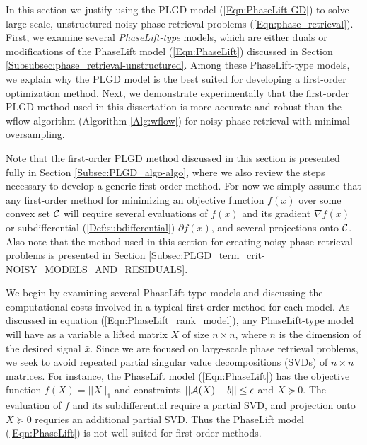 In this section we justify using the PLGD model (\ref{Eqn:PhaseLift-GD}) to solve large-scale, unstructured noisy phase retrieval problems (\ref{Eqn:phase_retrieval}). 
First, we examine several \textit{PhaseLift-type} models, which are either duals or modifications of the PhaseLift model (\ref{Eqn:PhaseLift}) discussed in Section \ref{Subsubsec:phase_retrieval-unstructured}.
Among these PhaseLift-type models, we explain why the PLGD model is the best suited for developing a first-order optimization method.
Next, we demonstrate experimentally that the first-order PLGD method used in this dissertation is more accurate and robust than the wflow algorithm (Algorithm \ref{Alg:wflow}) for noisy phase retrieval with minimal oversampling.

Note that the first-order PLGD method discussed in this section is presented fully in Section \ref{Subsec:PLGD_algo-algo}, where we also 
review the steps necessary to develop a generic first-order method.  
For now we simply assume that any first-order method for minimizing an objective function $f(x)$ over some convex set ${\mathcal C}$ will require several evaluations of $f(x)$ and its gradient $\nabla f(x)$ or subdifferential (\ref{Def:subdifferential}) $\partial f(x)$, and several projections onto ${\mathcal C}$.
Also note that the method used in this section for creating noisy phase retrieval problems is presented in Section \ref{Subsec:PLGD_term_crit-NOISY_MODELS_AND_RESIDUALS}.





We begin by examining several PhaseLift-type models and discussing the computational costs involved in a typical first-order method for each model.
As discussed in equation (\ref{Eqn:PhaseLift_rank_model}), any PhaseLift-type model will have as a variable a lifted matrix $X$ of size $n \times n$, where $n$ is the dimension of the desired signal $\bar{x}$.
Since we are focused on large-scale phase retrieval problems, we seek to avoid repeated partial singular value decompositions (SVDs) of $n \times n$ matrices.
For instance, the PhaseLift model (\ref{Eqn:PhaseLift}) has the objective function $f(X) = ||X||_1$ and constraints $||{\mathcal A}(X) - b|| \leq \epsilon$ and $X \succeq 0$.  
The evaluation of $f$ and its subdifferential require a partial SVD, and projection onto $X \succeq 0$ requries an additional partial SVD.
Thus the PhaseLift model (\ref{Eqn:PhaseLift}) is not well suited for first-order methods.

